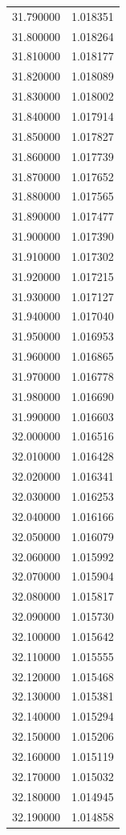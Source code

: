 \begin{tabular}{rr}
31.790000 & 1.018351 \\
31.800000 & 1.018264 \\
31.810000 & 1.018177 \\
31.820000 & 1.018089 \\
31.830000 & 1.018002 \\
31.840000 & 1.017914 \\
31.850000 & 1.017827 \\
31.860000 & 1.017739 \\
31.870000 & 1.017652 \\
31.880000 & 1.017565 \\
31.890000 & 1.017477 \\
31.900000 & 1.017390 \\
31.910000 & 1.017302 \\
31.920000 & 1.017215 \\
31.930000 & 1.017127 \\
31.940000 & 1.017040 \\
31.950000 & 1.016953 \\
31.960000 & 1.016865 \\
31.970000 & 1.016778 \\
31.980000 & 1.016690 \\
31.990000 & 1.016603 \\
32.000000 & 1.016516 \\
32.010000 & 1.016428 \\
32.020000 & 1.016341 \\
32.030000 & 1.016253 \\
32.040000 & 1.016166 \\
32.050000 & 1.016079 \\
32.060000 & 1.015992 \\
32.070000 & 1.015904 \\
32.080000 & 1.015817 \\
32.090000 & 1.015730 \\
32.100000 & 1.015642 \\
32.110000 & 1.015555 \\
32.120000 & 1.015468 \\
32.130000 & 1.015381 \\
32.140000 & 1.015294 \\
32.150000 & 1.015206 \\
32.160000 & 1.015119 \\
32.170000 & 1.015032 \\
32.180000 & 1.014945 \\
32.190000 & 1.014858 \\

\end{tabular}
